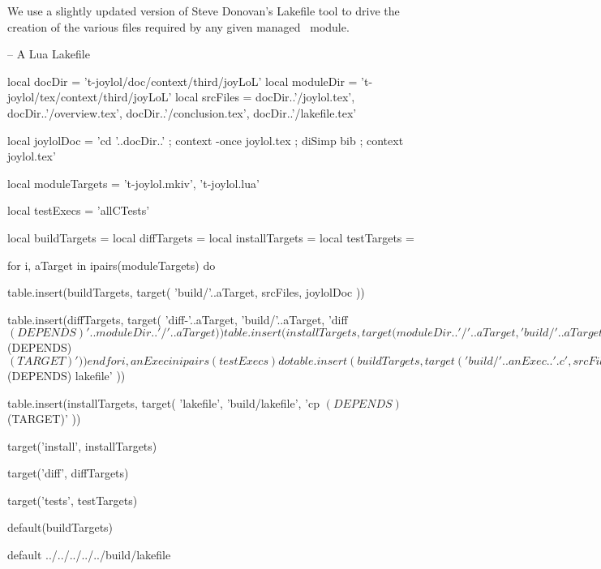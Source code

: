 
\startchapter[title=Lakefile]

We use a slightly updated version of Steve Donovan's Lakefile tool to 
drive the creation of the various files required by any given 
 managed \ConTeXt\ module. 

\startLakefile
-- A Lua Lakefile

local docDir    = 't-joylol/doc/context/third/joyLoL'
local moduleDir = 't-joylol/tex/context/third/joyLoL'
local srcFiles = {
  docDir..'/joylol.tex',
  docDir..'/overview.tex',
  docDir..'/conclusion.tex',
  docDir..'/lakefile.tex'
}

local joylolDoc = 
  'cd '..docDir..' ; context -once joylol.tex ; diSimp bib ; context joylol.tex'

local moduleTargets = {
  't-joylol.mkiv',
  't-joylol.lua'
}

local testExecs = {
  'allCTests'
}

local buildTargets   = { }
local diffTargets    = { }
local installTargets = { }
local testTargets    = { }

for i, aTarget in ipairs(moduleTargets) do

  table.insert(buildTargets, target(
    'build/'..aTarget,
    srcFiles,
    joylolDoc
  ))

  table.insert(diffTargets, target(
    'diff-'..aTarget,
    'build/'..aTarget,
    'diff $(DEPENDS) '..moduleDir..'/'..aTarget
  ))

  table.insert(installTargets, target(
    moduleDir..'/'..aTarget,
    'build/'..aTarget,
    'cp $(DEPENDS) $(TARGET)'
  ))
end

for i, anExec in ipairs(testExecs) do

  table.insert(buildTargets, target(
    'build/'..anExec..'.c',
    srcFiles,
    joylolDoc
  ))

  c.program{
    'build/'..anExec,
    src=anExec..'.c',
    cdir='build',
    needs='lua5.2'
  }
  
  table.insert(testTargets, target(
    'build/'..anExec..'-results.lua',
    'build/'..anExec,
    './build/'..anExec
  ))
end

table.insert(buildTargets, target(
  'build/lakefile',
  srcFiles,
  joylolDoc
))

table.insert(diffTargets, target(
  'diff-lakefile',
  'build/lakefile',
  'diff $(DEPENDS) lakefile'
))

table.insert(installTargets, target(
  'lakefile',
  'build/lakefile',
  'cp $(DEPENDS) $(TARGET)'
))

target('install', installTargets)

target('diff', diffTargets)

target('tests', testTargets)

default(buildTargets)
\stopLakefile

\createLakefileFile%
  {default}%
  {../../../../../build/lakefile}%
  {}

\stopchapter